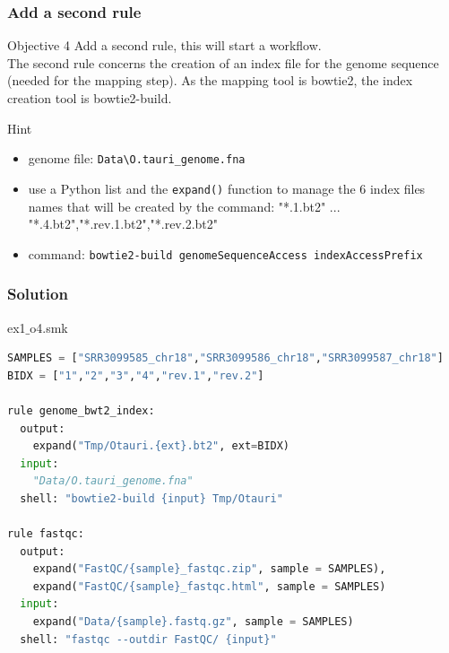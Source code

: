 \begin{frame}[containsverbatim]
\frametitle{Add a second rule}
\begin{exampleblock}{Objective 4}
Add a second rule, this will start a workflow. \\
The second rule concerns the creation of an index file for the genome sequence (needed for the mapping step). As the mapping tool is bowtie2, the index creation tool is bowtie2-build.
\end{exampleblock}
\begin{exampleblock}{Hint}
\begin{itemize}
    \item genome file: \verb|Data\O.tauri_genome.fna|
    \item use a Python list and the \verb|expand()| function to manage the 6 index files names that will be created by the command: "*.1.bt2" ... "*.4.bt2","*.rev.1.bt2","*.rev.2.bt2"
    \item command: \verb|bowtie2-build genomeSequenceAccess indexAccessPrefix|
\end{itemize}
\end{exampleblock}
\end{frame}
\begin{frame}[containsverbatim]
\frametitle{Solution}
\begin{exampleblock}{ex1$\_$o4.smk}
\begin{lstlisting}[language=python]
SAMPLES = ["SRR3099585_chr18","SRR3099586_chr18","SRR3099587_chr18"]
BIDX = ["1","2","3","4","rev.1","rev.2"]

rule genome_bwt2_index:
  output:
    expand("Tmp/Otauri.{ext}.bt2", ext=BIDX)
  input:
    "Data/O.tauri_genome.fna"
  shell: "bowtie2-build {input} Tmp/Otauri"

rule fastqc:
  output:
    expand("FastQC/{sample}_fastqc.zip", sample = SAMPLES),
    expand("FastQC/{sample}_fastqc.html", sample = SAMPLES)
  input:
    expand("Data/{sample}.fastq.gz", sample = SAMPLES)
  shell: "fastqc --outdir FastQC/ {input}"
\end{lstlisting}
\end{exampleblock}
\end{frame}
